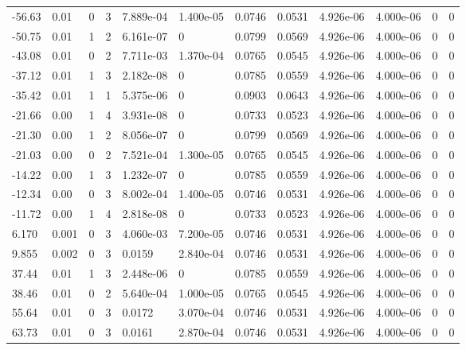 \documentclass[preview]{standalone}
\begin{document}
{{\begin{tabular}{L{1.2cm}C{1.2cm} C{0.3cm}C{0.5cm} C{1.4cm}C{1.4cm} C{1.4cm}C{1.4cm} C{1.6cm}C{1.6cm} C{1.6cm}C{1.6cm}}
  -56.63  &  0.01  & 0     &  3 &  7.889e-04  & 1.400e-05  &  0.0746&   0.0531& 4.926e-06 & 4.000e-06   &  0 & 0  \\ 
  -50.75  &  0.01  & 1     &  2 &  6.161e-07  & 0  &  0.0799&   0.0569& 4.926e-06 & 4.000e-06   &  0 & 0  \\ 
  -43.08  &  0.01  & 0     &  2 &  7.711e-03  & 1.370e-04  &  0.0765&   0.0545& 4.926e-06 & 4.000e-06   &  0 & 0  \\ 
  -37.12  &  0.01  & 1     &  3 &  2.182e-08  & 0  &  0.0785&   0.0559& 4.926e-06 & 4.000e-06   &  0 & 0  \\ 
  -35.42  &  0.01  & 1     &  1 &  5.375e-06  & 0  &  0.0903&   0.0643& 4.926e-06 & 4.000e-06   &  0 & 0  \\ 
  -21.66  &  0.00  & 1     &  4 &  3.931e-08  & 0  &  0.0733&   0.0523& 4.926e-06 & 4.000e-06   &  0 & 0  \\ 
  -21.30  &  0.00  & 1     &  2 &  8.056e-07  & 0  &  0.0799&   0.0569& 4.926e-06 & 4.000e-06   &  0 & 0  \\ 
  -21.03  &  0.00  & 0     &  2 &  7.521e-04  & 1.300e-05  &  0.0765&   0.0545& 4.926e-06 & 4.000e-06   &  0 & 0  \\ 
  -14.22  &  0.00  & 1     &  3 &  1.232e-07  & 0  &  0.0785&   0.0559& 4.926e-06 & 4.000e-06   &  0 & 0  \\ 
  -12.34  &  0.00  & 0     &  3 &  8.002e-04  & 1.400e-05  &  0.0746&   0.0531& 4.926e-06 & 4.000e-06   &  0 & 0  \\ 
  -11.72  &  0.00  & 1     &  4 &  2.818e-08  & 0  &  0.0733&   0.0523& 4.926e-06 & 4.000e-06   &  0 & 0  \\ 
  6.170  &  0.001  & 0     &  3 &  4.060e-03  & 7.200e-05  &  0.0746&   0.0531& 4.926e-06 & 4.000e-06   &  0 & 0  \\ 
  9.855  &  0.002  & 0     &  3 &  0.0159  & 2.840e-04  &  0.0746&   0.0531& 4.926e-06 & 4.000e-06   &  0 & 0  \\ 
  37.44  &  0.01  & 1     &  3 &  2.448e-06  & 0  &  0.0785&   0.0559& 4.926e-06 & 4.000e-06   &  0 & 0  \\ 
  38.46  &  0.01  & 0     &  2 &  5.640e-04  & 1.000e-05  &  0.0765&   0.0545& 4.926e-06 & 4.000e-06   &  0 & 0  \\ 
  55.64  &  0.01  & 0     &  3 &  0.0172  & 3.070e-04  &  0.0746&   0.0531& 4.926e-06 & 4.000e-06   &  0 & 0  \\ 
  63.73  &  0.01  & 0     &  3 &  0.0161  & 2.870e-04  &  0.0746&   0.0531& 4.926e-06 & 4.000e-06   &  0 & 0  \\ 

\end{tabular}}}
\end{document}
